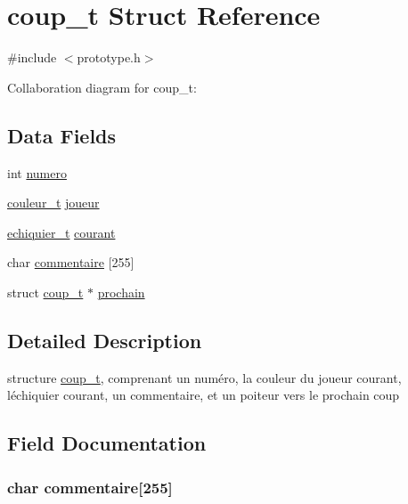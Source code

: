 \hypertarget{structcoup__t}{}\section{coup\+\_\+t Struct Reference}
\label{structcoup__t}


{\ttfamily \#include $<$prototype.\+h$>$}



Collaboration diagram for coup\+\_\+t\+:
\subsection*{Data Fields}
\begin{DoxyCompactItemize}
\item 
int \hyperlink{structcoup__t_a2c30f43104974e72e2809fb4569804b0}{numero}
\item 
\hyperlink{prototype_8h_a2fc0928aba15295ee980b903ed92f23f}{couleur\+\_\+t} \hyperlink{structcoup__t_a5a01f66d53ebc32c2b2783fe2174aef8}{joueur}
\item 
\hyperlink{structechiquier__t}{echiquier\+\_\+t} \hyperlink{structcoup__t_a23bc58e9e0e54e9f173c2cb43bc127e9}{courant}
\item 
char \hyperlink{structcoup__t_af9ad893621d2105556aceeb452fe715c}{commentaire} \mbox{[}255\mbox{]}
\item 
struct \hyperlink{structcoup__t}{coup\+\_\+t} $\ast$ \hyperlink{structcoup__t_a6061643e85d05b42fd9eb356c664b38e}{prochain}
\end{DoxyCompactItemize}


\subsection{Detailed Description}
structure \hyperlink{structcoup__t}{coup\+\_\+t}, comprenant un numéro, la couleur du joueur courant, l\textquotesingle{}échiquier courant, un commentaire, et un poiteur vers le prochain coup 

\subsection{Field Documentation}
\subsubsection[{\texorpdfstring{commentaire}{commentaire}}]{\setlength{\rightskip}{0pt plus 5cm}char commentaire\mbox{[}255\mbox{]}}\hypertarget{structcoup__t_af9ad893621d2105556aceeb452fe715c}{}\label{structcoup__t_af9ad893621d2105556aceeb452fe715c}
